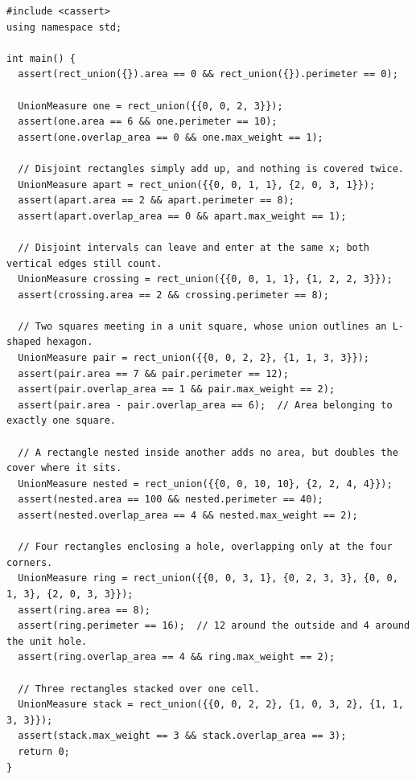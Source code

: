 \begin{lstlisting}[style=cpp]
#include <cassert>
using namespace std;

int main() {
  assert(rect_union({}).area == 0 && rect_union({}).perimeter == 0);

  UnionMeasure one = rect_union({{0, 0, 2, 3}});
  assert(one.area == 6 && one.perimeter == 10);
  assert(one.overlap_area == 0 && one.max_weight == 1);

  // Disjoint rectangles simply add up, and nothing is covered twice.
  UnionMeasure apart = rect_union({{0, 0, 1, 1}, {2, 0, 3, 1}});
  assert(apart.area == 2 && apart.perimeter == 8);
  assert(apart.overlap_area == 0 && apart.max_weight == 1);

  // Disjoint intervals can leave and enter at the same x; both vertical edges still count.
  UnionMeasure crossing = rect_union({{0, 0, 1, 1}, {1, 2, 2, 3}});
  assert(crossing.area == 2 && crossing.perimeter == 8);

  // Two squares meeting in a unit square, whose union outlines an L-shaped hexagon.
  UnionMeasure pair = rect_union({{0, 0, 2, 2}, {1, 1, 3, 3}});
  assert(pair.area == 7 && pair.perimeter == 12);
  assert(pair.overlap_area == 1 && pair.max_weight == 2);
  assert(pair.area - pair.overlap_area == 6);  // Area belonging to exactly one square.

  // A rectangle nested inside another adds no area, but doubles the cover where it sits.
  UnionMeasure nested = rect_union({{0, 0, 10, 10}, {2, 2, 4, 4}});
  assert(nested.area == 100 && nested.perimeter == 40);
  assert(nested.overlap_area == 4 && nested.max_weight == 2);

  // Four rectangles enclosing a hole, overlapping only at the four corners.
  UnionMeasure ring = rect_union({{0, 0, 3, 1}, {0, 2, 3, 3}, {0, 0, 1, 3}, {2, 0, 3, 3}});
  assert(ring.area == 8);
  assert(ring.perimeter == 16);  // 12 around the outside and 4 around the unit hole.
  assert(ring.overlap_area == 4 && ring.max_weight == 2);

  // Three rectangles stacked over one cell.
  UnionMeasure stack = rect_union({{0, 0, 2, 2}, {1, 0, 3, 2}, {1, 1, 3, 3}});
  assert(stack.max_weight == 3 && stack.overlap_area == 3);
  return 0;
}
\end{lstlisting}
